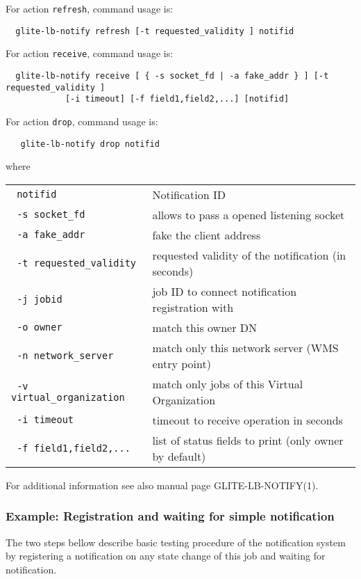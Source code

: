 For action \verb'refresh', command usage is:
\begin{verbatim}
  glite-lb-notify refresh [-t requested_validity ] notifid
\end{verbatim}

For action \verb'receive', command usage is:
\begin{verbatim}
  glite-lb-notify receive [ { -s socket_fd | -a fake_addr } ] [-t requested_validity ] 
            [-i timeout] [-f field1,field2,...] [notifid]
\end{verbatim}

For action \verb'drop', command usage is:
\begin{verbatim}
   glite-lb-notify drop notifid
\end{verbatim}

where

\begin{tabularx}{\textwidth}{lX}
\texttt{  notifid} & Notification ID \\
\texttt{  -s socket\_fd} &  allows  to  pass  a opened listening socket  \\
\texttt{  -a fake\_addr} &  fake the client address \\
\texttt{  -t requested\_validity} & requested validity of the notification (in seconds)   \\
\texttt{  -j jobid} & job ID to connect notification registration with   \\
\texttt{  -o owner} & match this owner DN   \\
\texttt{  -n network\_server} &  match only this network server (WMS entry point)  \\
\texttt{  -v virtual\_organization} & match only jobs of this Virtual Organization  \\
\texttt{  -i timeout} & timeout to receive operation in seconds   \\
\texttt{  -f field1,field2,...} & list of status fields to print (only owner by default)   \\
\end{tabularx}

For additional information see also manual page GLITE-LB-NOTIFY(1).

\subsubsection{Example: Registration and waiting for simple notification}
\label{e:notify}

The two steps bellow describe basic testing procedure of the notification
system by registering a notification on any state change of this job
and waiting for notification.

